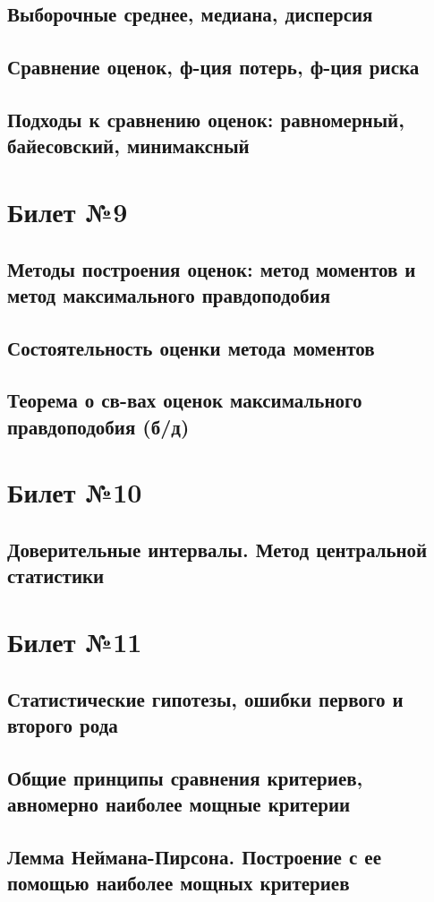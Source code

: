 \documentclass[a4paper]{article}
\theoremstyle{plain}
\theoremstyle{remark}
\theoremstyle{definition}
\begin{document}
\subsection{Выборочные среднее, медиана, дисперсия}
\subsection{Сравнение оценок, ф-ция потерь, ф-ция риска}
\subsection{Подходы к сравнению оценок: равномерный, байесовский, минимаксный}

\section{Билет №9}
\subsection{Методы построения оценок: метод моментов и метод максимального правдоподобия}
\subsection{Состоятельность оценки метода моментов}
\subsection{Теорема о св-вах оценок максимального правдоподобия (б/д)}

\section{Билет №10}
\subsection{Доверительные интервалы. Метод центральной статистики}

\section{Билет №11}
\subsection{Статистические гипотезы, ошибки первого и второго рода}
\subsection{Общие принципы сравнения критериев, авномерно наиболее мощные критерии}
\subsection{Лемма Неймана-Пирсона. Построение с ее помощью наиболее мощных критериев}
\end{document}
